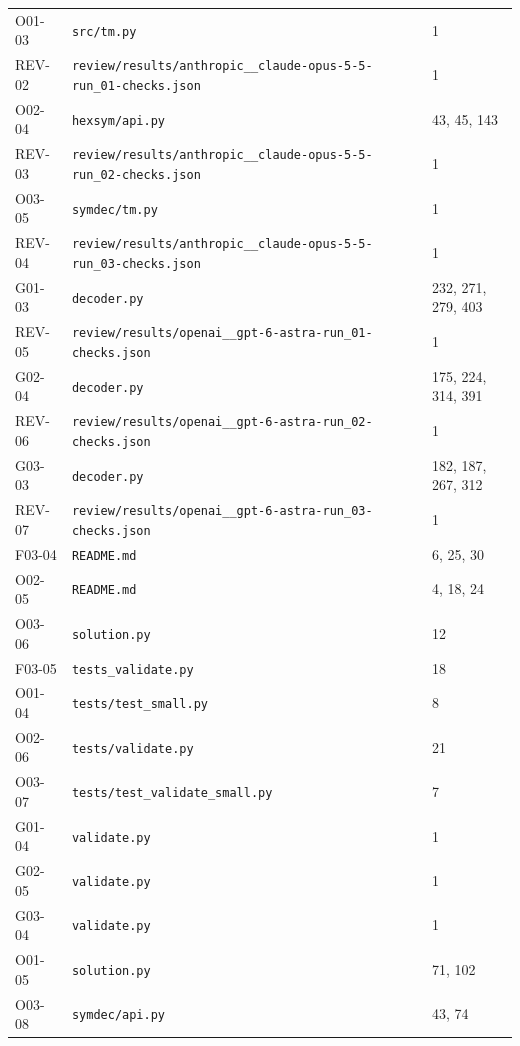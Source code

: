 \documentclass[11pt,a4paper]{article}
\begin{document}
{\begin{longtable}
{}\label{src:O01-03}O01-03 & \nolinkurl{src/tm.py} & 1\tabularnewline
{}\label{src:REV-02}REV-02 & \nolinkurl{review/results/anthropic__claude-opus-5-5-run_01-checks.json} & 1\tabularnewline
{}\label{src:O02-04}O02-04 & \nolinkurl{hexsym/api.py} & 43,\allowbreak{} 45,\allowbreak{} 143\tabularnewline
{}\label{src:REV-03}REV-03 & \nolinkurl{review/results/anthropic__claude-opus-5-5-run_02-checks.json} & 1\tabularnewline
{}\label{src:O03-05}O03-05 & \nolinkurl{symdec/tm.py} & 1\tabularnewline
{}\label{src:REV-04}REV-04 & \nolinkurl{review/results/anthropic__claude-opus-5-5-run_03-checks.json} & 1\tabularnewline
{}\label{src:G01-03}G01-03 & \nolinkurl{decoder.py} & 232,\allowbreak{} 271,\allowbreak{} 279,\allowbreak{} 403\tabularnewline
{}\label{src:REV-05}REV-05 & \nolinkurl{review/results/openai__gpt-6-astra-run_01-checks.json} & 1\tabularnewline
{}\label{src:G02-04}G02-04 & \nolinkurl{decoder.py} & 175,\allowbreak{} 224,\allowbreak{} 314,\allowbreak{} 391\tabularnewline
{}\label{src:REV-06}REV-06 & \nolinkurl{review/results/openai__gpt-6-astra-run_02-checks.json} & 1\tabularnewline
{}\label{src:G03-03}G03-03 & \nolinkurl{decoder.py} & 182,\allowbreak{} 187,\allowbreak{} 267,\allowbreak{} 312\tabularnewline
{}\label{src:REV-07}REV-07 & \nolinkurl{review/results/openai__gpt-6-astra-run_03-checks.json} & 1\tabularnewline
{}\label{src:F03-04}F03-04 & \nolinkurl{README.md} & 6,\allowbreak{} 25,\allowbreak{} 30\tabularnewline
{}\label{src:O02-05}O02-05 & \nolinkurl{README.md} & 4,\allowbreak{} 18,\allowbreak{} 24\tabularnewline
{}\label{src:O03-06}O03-06 & \nolinkurl{solution.py} & 12\tabularnewline
{}\label{src:F03-05}F03-05 & \nolinkurl{tests_validate.py} & 18\tabularnewline
{}\label{src:O01-04}O01-04 & \nolinkurl{tests/test_small.py} & 8\tabularnewline
{}\label{src:O02-06}O02-06 & \nolinkurl{tests/validate.py} & 21\tabularnewline
{}\label{src:O03-07}O03-07 & \nolinkurl{tests/test_validate_small.py} & 7\tabularnewline
{}\label{src:G01-04}G01-04 & \nolinkurl{validate.py} & 1\tabularnewline
{}\label{src:G02-05}G02-05 & \nolinkurl{validate.py} & 1\tabularnewline
{}\label{src:G03-04}G03-04 & \nolinkurl{validate.py} & 1\tabularnewline
{}\label{src:O01-05}O01-05 & \nolinkurl{solution.py} & 71,\allowbreak{} 102\tabularnewline
{}\label{src:O03-08}O03-08 & \nolinkurl{symdec/api.py} & 43,\allowbreak{} 74\tabularnewline

\end{longtable}}
\end{document}
